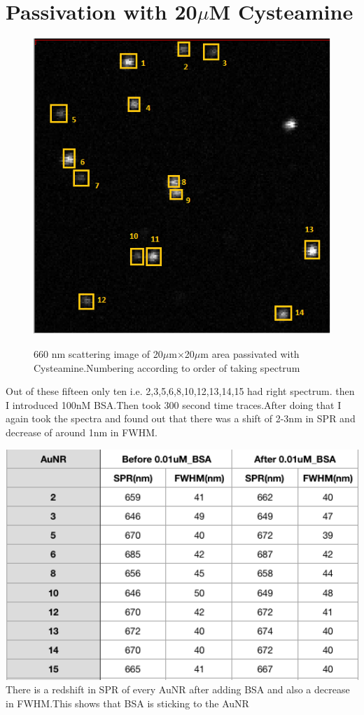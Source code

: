 \documentclass[twoside,single]{lion-msc}
\begin{document}
\section{Passivation with 20$\mu$M Cysteamine}
\begin{figure}[H]
\includegraphics[width=.6\textwidth,center]{3.png}\\
\caption {660 nm scattering image of 20$\mu$m$\times$20$\mu$m area passivated with Cysteamine.Numbering according to order of taking spectrum}
\end{figure}
Out of these fifteen only ten i.e. 2,3,5,6,8,10,12,13,14,15 had right spectrum.
then I introduced 100nM BSA.Then took 300 second time traces.After doing that I again took the spectra and found out that there was a shift of 2-3nm in SPR and decrease of around 1nm in FWHM.
\begin{table}[H]
\includegraphics[width=1\textwidth,center]{4.png}\\
\caption {There is a redshift in SPR of every AuNR after adding BSA and also a decrease in FWHM.This shows that BSA is sticking to the AuNR}
\end{table}
\end{document}
